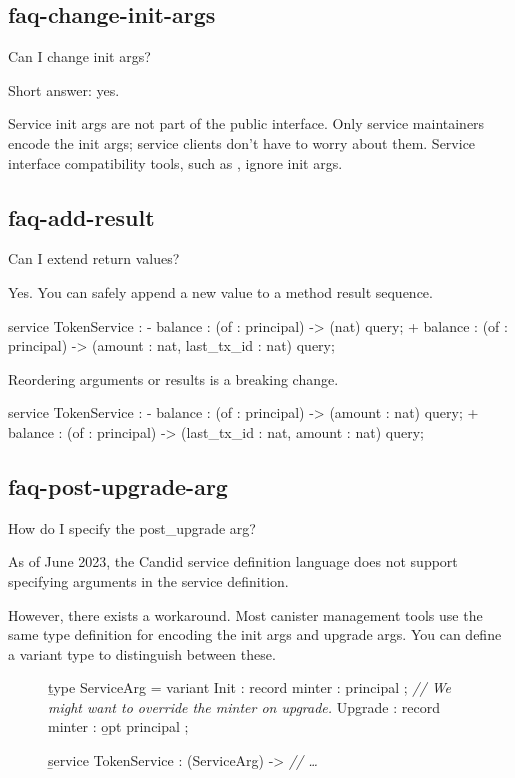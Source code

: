 \documentclass{article}
\begin{document}
\subsection{faq-change-init-args}{Can I change init args?}

Short answer: yes.

Service init args are not part of the public interface.
Only service maintainers encode the init args; service clients don't have to worry about them.
Service interface compatibility tools, such as \href{https://github.com/dfinity/candid/blob/e212e096cb726548c6d6edba1189375dc5ad364e/tools/didc/README.md}{}, ignore init args.

\subsection{faq-add-result}{Can I extend return values?}

Yes.
You can safely append a new value to a method result sequence.

\begin{code}[good]
 service TokenService : {
-  balance : (of : principal) -> (nat) query;
+  balance : (of : principal) -> (amount : nat, last_tx_id : nat) query;
 }
\end{code}

Reordering arguments or results is a breaking change.

\begin{code}[bad]
 service TokenService : {
-  balance : (of : principal) -> (amount : nat) query;
+  balance : (of : principal) -> (last_tx_id : nat, amount : nat) query;
 }
\end{code}

\subsection{faq-post-upgrade-arg}{How do I specify the post_upgrade arg?}

As of June 2023, the Candid service definition language does not support specifying  arguments in the service definition.

However, there exists a workaround.
Most canister management tools use the same type definition for encoding the init args and upgrade args.
You can define a variant type to distinguish between these.

\begin{figure}

\begin{code}[candid]
\b{type} ServiceArg = variant {
  Init    : record { minter : principal };
  \emph{// We might want to override the minter on upgrade.}
  Upgrade : record { minter : \b{opt} principal }
};

\b{service} TokenService : (ServiceArg) -> {
  \emph{// \ldots}
}
\end{code}
\end{figure}
\end{document}
